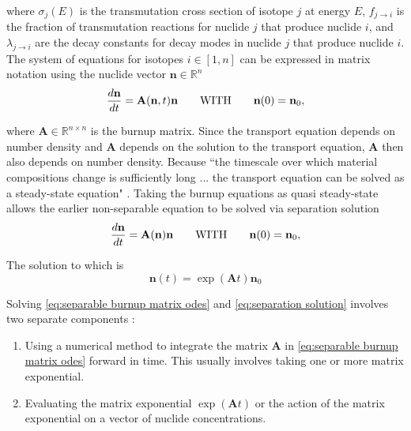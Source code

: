 \documentclass[letterpaper]{physor2024}
\begin{document}
\noindent where $\sigma_{j}(E)$ is the transmutation cross section of isotope $j$ at energy $E$, $f_{j\rightarrow{i}}$ is the fraction of transmutation reactions for nuclide $j$ that produce nuclide $i$, and $\lambda_{j\rightarrow{i}}$ are the decay constants for decay modes in nuclide $j$ that produce nuclide $i$. The system of equations for isotopes $i\in[1,n]$ can be expressed in matrix notation using the nuclide vector $\mathbf{n}\in\mathbb{R}^{n}$
\begin{equation} \label{eq:burnup matrix odes}
    \frac{d\textbf{n}}{dt} =
    \textbf{A}(\textbf{n},t) \textbf{n}
    \qquad \text{WITH} \qquad
    \textbf{n}(0) = \textbf{n}_{0},
\end{equation}

\noindent where $\textbf{A}\in\mathbb{R}^{n\times n}$ is the burnup matrix. Since the transport equation depends on number density and $\textbf{A}$ depends on the solution to the transport equation, $\textbf{A}$ then also depends on number density. Because ``the timescale over which material compositions change is sufficiently long ... the transport equation can be solved as a steady-state equation" \cite{romano-depletion-2021}. Taking the burnup equations as quasi steady-state allows the earlier non-separable equation to be solved via separation solution
\begin{equation} \label{eq:separable burnup matrix odes}
    \frac{d\textbf{n}}{dt} =
    \textbf{A}(\textbf{n}) \textbf{n}
    \qquad \text{WITH} \qquad
    \textbf{n}(0) = \textbf{n}_{0},
\end{equation}

\noindent The solution to which is
\begin{equation} \label{eq:separation solution}
     \textbf{n}(t) = \exp(\textbf{A}t) \textbf{n}_{0}
\end{equation}

\noindent Solving \cref{eq:separable burnup matrix odes} and \cref{eq:separation solution} involves two separate components \cite{romano-depletion-2021}:
\begin{enumerate}
    \item Using a numerical method to integrate the matrix $\textbf{A}$ in \cref{eq:separable burnup matrix odes} forward in time. This usually involves taking one or more matrix exponential.
    \item Evaluating the matrix exponential $\exp(\textbf{A}t)$ or the action of the matrix exponential on a vector of nuclide concentrations.
\end{enumerate}
\end{document}
